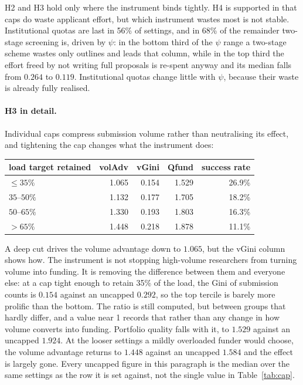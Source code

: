 \documentclass[11pt,a4paper]{article}
\begin{document}
H2 and H3 hold only where the instrument binds tightly. H4 is supported in that
caps do waste applicant effort, but which instrument wastes most is not stable.
Institutional quotas are last in 56\% of settings, and in 68\% of the remainder
two-stage screening is, driven by $\psi$: in the bottom third of the $\psi$ range a two-stage scheme
wastes only outlines and leads that column, while in the top third the effort
freed by not writing full proposals is re-spent anyway and its median falls from
$0.264$ to $0.119$. Institutional quotas change little with $\psi$, because their
waste is already fully realised.

\paragraph{H3 in detail.} Individual caps compress submission volume rather than
neutralising its effect, and tightening the cap changes what the instrument does:

\begin{center}
\small
\begin{tabular}{lrrrr}
\toprule
load target retained & volAdv & vGini & Qfund & success rate \\
\midrule
$\le 35\%$      & 1.065 & 0.154 & 1.529 & 26.9\% \\
$35$--$50\%$    & 1.132 & 0.177 & 1.705 & 18.2\% \\
$50$--$65\%$    & 1.330 & 0.193 & 1.803 & 16.3\% \\
$>65\%$         & 1.448 & 0.218 & 1.878 & 11.1\% \\
\bottomrule
\end{tabular}
\end{center}

A deep cut drives the volume advantage down to $1.065$, but the vGini column shows
how. The instrument is not stopping high-volume researchers from turning volume
into funding. It is removing the difference between them and everyone else: at a
cap tight enough to retain 35\% of the load, the Gini of submission counts is
$0.154$ against an uncapped $0.292$, so the top tercile is barely more prolific
than the bottom. The ratio is still computed, but between groups that hardly
differ, and a value near 1 records that rather than any change in how volume
converts into funding. Portfolio quality falls with it, to $1.529$ against
an uncapped $1.924$. At the looser settings a mildly overloaded funder would
choose, the volume advantage returns to $1.448$ against an uncapped $1.584$ and
the effect is largely gone. Every uncapped figure in this paragraph is the median
over the same settings as the row it is set against, not the single value in
Table~\ref{tab:cap}.
\end{document}
